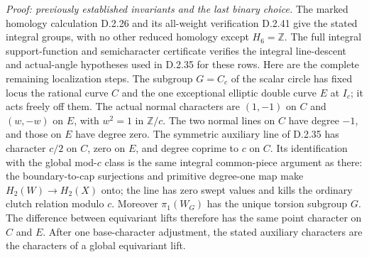 \emph{Proof: previously established invariants and the last binary choice.}
The marked homology calculation D.2.26 and its all-weight verification
D.2.41 give the stated integral groups, with no other reduced homology
except $H_6=\mathbb Z$. The full integral support-function and
semicharacter certificate
verifies the integral line-descent and actual-angle hypotheses
used in D.2.35 for these rows. Here are the complete remaining
localization steps. The subgroup $G=C_c$ of the scalar circle has
fixed locus the rational curve $C$ and the one exceptional
elliptic double curve $E$ at $I_c$; it acts freely off them.
The actual normal characters are $(1,-1)$ on $C$ and $(w,-w)$
on $E$, with $w^2=1$ in $\mathbb Z/c$. The two normal lines on
$C$ have degree $-1$, and those on $E$ have degree zero.
The symmetric auxiliary line of D.2.35 has character $c/2$ on
$C$, zero on $E$, and degree coprime to $c$ on $C$.
Its identification with the global mod-$c$ class is the same
integral common-piece argument as there: the boundary-to-cap
surjections and primitive degree-one map make $H_2(W)\to H_2(X)$
onto; the line has zero swept values and kills the ordinary
clutch relation modulo $c$. Moreover $\pi_1(W_G)$ has the
unique torsion subgroup $G$. The difference between equivariant
lifts therefore has the same point character on $C$ and $E$.
After one base-character adjustment, the stated auxiliary
characters are the characters of a global equivariant lift.


